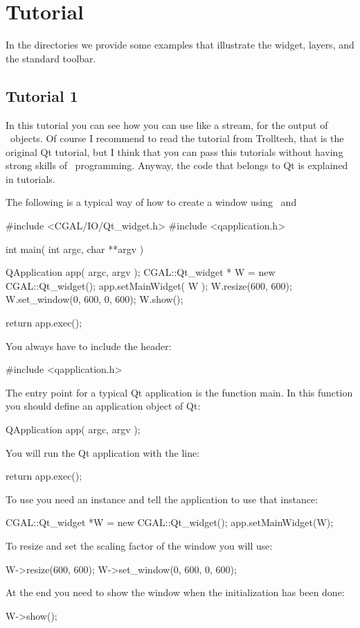 \section{Tutorial}

In the directories  we provide some examples that illustrate the widget, layers, and the standard toolbar.

\subsection*{Tutorial 1}

In this tutorial you can see how you can use  like
a stream, for the output of \cgal\ objects.  Of course I recommend to read
the tutorial from Trolltech, that is the original Qt tutorial, but I
think that you can pass this tutorials without having strong skills of \qt\
programming. Anyway, the code that belongs to Qt is explained in tutorials.

The following is a typical way of how to create a window using
\qt\ and 
\begin{ccExampleCode}
#include <CGAL/IO/Qt_widget.h>
#include <qapplication.h>

int main( int argc, char **argv )
{
    QApplication app( argc, argv );
    CGAL::Qt_widget * W = new CGAL::Qt_widget();
    app.setMainWidget( W );
    W.resize(600, 600);
    W.set_window(0, 600, 0, 600);
    W.show();

    return app.exec();
}
\end{ccExampleCode}
You always have to include the header:
\begin{ccExampleCode}
#include <qapplication.h>
\end{ccExampleCode}

The entry point for a typical Qt application is the function main. In
this function you should define an application object of Qt:
\begin{ccExampleCode}
QApplication app( argc, argv );
\end{ccExampleCode}
You will run the Qt application with the line:
\begin{ccExampleCode}
return app.exec();
\end{ccExampleCode}
To use  you need an instance and tell the
application to use that instance:
\begin{ccExampleCode}
CGAL::Qt_widget *W = new CGAL::Qt_widget();
app.setMainWidget(W);
\end{ccExampleCode}
To resize and set the scaling factor of the window you will use:
\begin{ccExampleCode}
W->resize(600, 600);
W->set_window(0, 600, 0, 600);
\end{ccExampleCode}
At the end you need to show the window when the initialization has been done:
\begin{ccExampleCode}
W->show();
\end{ccExampleCode}

